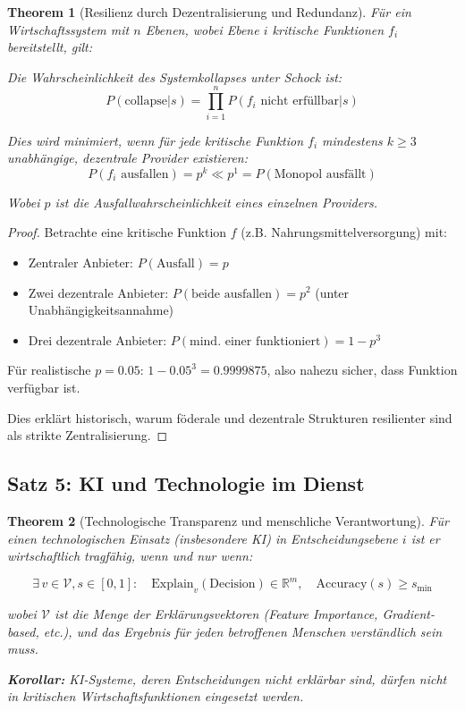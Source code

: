 \documentclass[a4paper, 12pt, twoside, openright]{report}
\newtheorem{theorem}{Theorem}[section]
\theoremstyle{definition}
\theoremstyle{definition}
\begin{document}
\begin{theorem}[Resilienz durch Dezentralisierung und Redundanz]
\label{thm:dezentralisierte-resilienz}
Für ein Wirtschaftssystem mit $n$ Ebenen, wobei Ebene $i$ kritische Funktionen $f_i$ bereitstellt, gilt:

Die Wahrscheinlichkeit des Systemkollapses unter Schock ist:
\begin{equation}
P(\text{collapse}|s) = \prod_{i=1}^{n} P(f_i \text{ nicht erfüllbar}|s)
\end{equation}

Dies wird minimiert, wenn für jede kritische Funktion $f_i$ mindestens $k \geq 3$ unabhängige, dezentrale Provider existieren:
\begin{equation}
P(f_i \text{ ausfallen}) = p^k \ll p^1 = P(\text{Monopol ausfällt})
\end{equation}

Wobei $p$ ist die Ausfallwahrscheinlichkeit eines einzelnen Providers.
\end{theorem}

\begin{proof}
Betrachte eine kritische Funktion $f$ (z.B. Nahrungsmittelversorgung) mit:
\begin{itemize}
\item Zentraler Anbieter: $P(\text{Ausfall}) = p$
\item Zwei dezentrale Anbieter: $P(\text{beide ausfallen}) = p^2$ (unter Unabhängigkeitsannahme)
\item Drei dezentrale Anbieter: $P(\text{mind. einer funktioniert}) = 1 - p^3$
\end{itemize}

Für realistische $p = 0.05$: $1 - 0.05^3 = 0.9999875$, also nahezu sicher, dass Funktion verfügbar ist.

Dies erklärt historisch, warum föderale und dezentrale Strukturen resilienter sind als strikte Zentralisierung.
\end{proof}

\subsection{Satz 5: KI und Technologie im Dienst}

\begin{theorem}[Technologische Transparenz und menschliche Verantwortung]
\label{thm:technologie-transparenz}
Für einen technologischen Einsatz (insbesondere KI) in Entscheidungsebene $i$ ist er wirtschaftlich tragfähig, wenn und nur wenn:

\begin{equation}
\exists \, v \in \mathcal{V}, s \in [0,1]: \quad \text{Explain}_v(\text{Decision}) \in \mathbb{R}^m, \quad \text{Accuracy}(s) \geq s_{\min}
\end{equation}

wobei $\mathcal{V}$ ist die Menge der Erklärungsvektoren (Feature Importance, Gradient-based, etc.), und das Ergebnis für jeden betroffenen Menschen verständlich sein muss.

\textbf{Korollar:} KI-Systeme, deren Entscheidungen nicht erklärbar sind, dürfen nicht in kritischen Wirtschaftsfunktionen eingesetzt werden.
\end{theorem}
\end{document}
